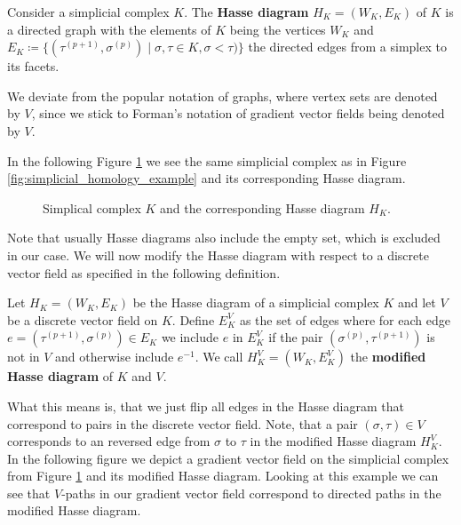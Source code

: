 Consider a simplicial complex $K$. The \textbf{Hasse diagram} $H_K = (W_K, E_K)$ of $K$ is a directed graph with the elements of $K$ being the vertices $W_K$ and $E_K \coloneqq \{(\tau^{(p+1)},\sigma^{(p)}) \mid \sigma, \tau \in K, \sigma < \tau)\}$ the directed edges from a simplex to its facets. 

We deviate from the popular notation of graphs, where vertex sets are denoted by $V$, since we stick to Forman's notation of gradient vector fields being denoted by $V$. 

In the following Figure \ref{fig:hasse_diagram_example} we see the same simplicial complex as in Figure \ref{fig:simplicial_homology_example} and its corresponding Hasse diagram.

\begin{figure}[H]
\begin{subfigure}[c]{0.99\textwidth}
\begin{center}

\end{center}
\end{subfigure}
\begin{subfigure}[c]{0.99\textwidth}
\begin{center}

\end{center}
\end{subfigure}
\caption{Simplical complex $K$ and the corresponding Hasse diagram $H_K$.}
\label{fig:hasse_diagram_example}
\end{figure}

Note that usually Hasse diagrams also include the empty set, which is excluded in our case. We will now modify the Hasse diagram with respect to a discrete vector field as specified in the following definition.

\begin{defi}
Let $H_K = (W_K, E_K)$ be the Hasse diagram of a simplicial complex $K$ and let $V$ be a discrete vector field on $K$. Define $E_K^V$ as the set of edges where for each edge $e = (\tau^{(p+1)}, \sigma^{(p)}) \in E_K$ we include $e$ in $E_K^V$ if the pair $(\sigma^{(p)}, \tau^{(p+1)})$ is not in $V$ and otherwise include $e^{-1}$. We call $H_K^V = (W_K, E_K^V)$ the \textbf{modified Hasse diagram} of $K$ and $V$.
\end{defi}

What this means is, that we just flip all edges in the Hasse diagram that correspond to pairs in the discrete vector field. Note, that a pair $(\sigma, \tau) \in V$ corresponds to an reversed edge from $\sigma$ to $\tau$ in the modified Hasse diagram $H_K^V$. In the following figure we depict a gradient vector field on the simplicial complex from Figure \ref{fig:hasse_diagram_example} and its modified Hasse diagram. Looking at this example we can see that $V$-paths in our gradient vector field correspond to directed paths in the modified Hasse diagram.

